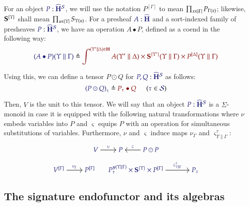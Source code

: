 \documentclass[11pt]{article}
\theoremstyle{definition}
\theoremstyle{remark}
\numberwithin{equation}{section}
\newcommand\HypCat{\mathbf{H}}
\begin{document}
For an object $\Of{P}{\widehat{\HypCat}^\Sorts}$, we will use the notation
$P^{[\Gamma]}$ to mean $\prod_{x\in\left\vert\Gamma\right\vert}P_{\Gamma(x)}$; likewise,
$\mathbf{S}^{\{\Upsilon\}}$ shall mean $\prod_{u\in\left\vert\Upsilon\right\vert}S_{\Upsilon(u)}$. For a
presheaf $\Of{A}{\widehat{\HypCat}}$ and a sort-indexed family of presheaves
$\Of{P}{\widehat{\HypCat}^\Sorts}$, we have an operation $A\bullet P$, defined
as a coend in the following way:
\[
  \Define{(A\bullet P)(\Upsilon\parallel\Gamma)}{
    \int^{(\Upsilon'\parallel\Delta)\in\HypCat}
      A(\Upsilon'\parallel\Delta)
      \times \SymPsh^{\{\Upsilon'\}}(\Upsilon\parallel\Gamma)
      \times P^{[\Delta]}(\Upsilon\parallel\Gamma)
  }
\]

Using this, we can define a tensor $P\odot Q$ for
$\Of{P,Q}{\widehat{\HypCat}^\Sorts}$ as follows:
\[
  \HypJ{
    \Define{{(P\odot Q)}_{\tau}}{
      P_\tau\bullet Q
    }
\quad
  }{
    \Member{\tau}{\Sorts}
  }
\]

Then, $V$ is the unit to this tensor. We will say that an object
$\Of{P}{\widehat{\HypCat}^\Sorts}$ is a $\Sigma$-monoid in case it is equipped
with the following natural transformations where $\nu$ embeds variables into $P$
and $\varsigma$ equips $P$ with an operation for simultaneous substitutions of
variables. Furthermore, $\nu$ and $\varsigma$ induce maps ${\nu}_{\Gamma}$ and
${\varsigma}^{\tau}_{\Upsilon\parallel\Gamma}$:
\begin{gather*}
  \begin{tikzcd}[cramped, ampersand replacement = \&]
    {\IMode{V}} \arrow[r, "\IMode\nu"]
    \&
    {\IMode{P}}
    \&
    {\IMode{P\odot P}}
      \arrow[l, swap, "\IMode\varsigma"]
  \end{tikzcd}\\[6pt]
  \begin{tikzcd}[cramped, ampersand replacement = \&]
    {\IMode{{V}^{[\Gamma]}}}
      \arrow[r, "\IMode{{\nu}_{\Gamma}}"]
    \&
    {\IMode{{P}^{[\Gamma]}}}
  \end{tikzcd}
  \qquad
  \begin{tikzcd}[cramped, sep = large, ampersand replacement = \&]
    {\IMode{{P_\tau^{\Yoneda{\Upsilon\parallel\Gamma}}\times \SymPsh^{\{\Upsilon\}}\times P^{[\Gamma]}}}}
      \arrow[r, "\IMode{\varsigma^\tau_{\Upsilon\parallel\Gamma}}"]
    \&
    {\IMode{P_\tau}}
  \end{tikzcd}
\end{gather*}

\subsection{The signature endofunctor and its algebras}
\end{document}
